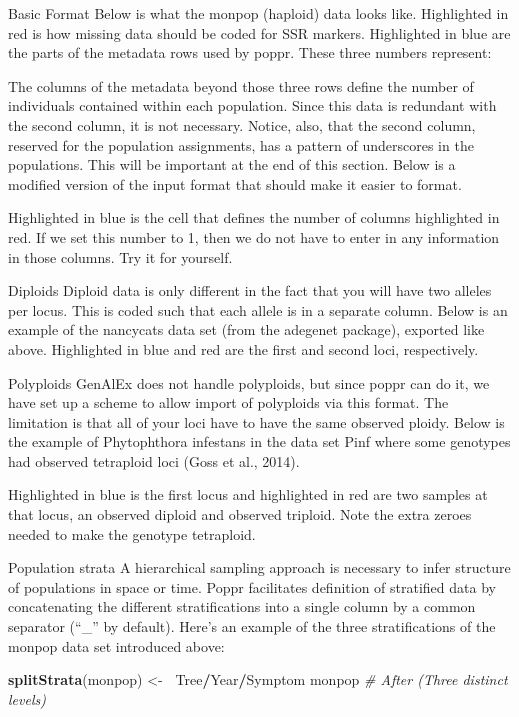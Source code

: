 \documentclass[12pt,]{krantz}
\newenvironment{Shaded}{\begin{snugshade}}{\end{snugshade}}
\newcommand{\KeywordTok}[1]{\textcolor[rgb]{0.27,0.27,0.27}{\textbf{#1}}}
\newcommand{\StringTok}[1]{\textcolor[rgb]{0.5,0.5,0.5}{#1}}
\newcommand{\CommentTok}[1]{\textcolor[rgb]{0.56,0.35,0.01}{\textit{#1}}}
\newcommand{\OperatorTok}[1]{\textcolor[rgb]{0.81,0.36,0.00}{\textbf{#1}}}
\newcommand{\ErrorTok}[1]{\textcolor[rgb]{0.64,0.00,0.00}{\textbf{#1}}}
\newcommand{\NormalTok}[1]{#1}
\theoremstyle{definition}
\theoremstyle{definition}
\theoremstyle{definition}
\theoremstyle{remark}
\begin{document}
Basic Format Below is what the monpop (haploid) data looks like.
Highlighted in red is how missing data should be coded for SSR markers.
Highlighted in blue are the parts of the metadata rows used by poppr.
These three numbers represent:

The columns of the metadata beyond those three rows define the number of
individuals contained within each population. Since this data is
redundant with the second column, it is not necessary. Notice, also,
that the second column, reserved for the population assignments, has a
pattern of underscores in the populations. This will be important at the
end of this section. Below is a modified version of the input format
that should make it easier to format.

Highlighted in blue is the cell that defines the number of columns
highlighted in red. If we set this number to 1, then we do not have to
enter in any information in those columns. Try it for yourself.

Diploids Diploid data is only different in the fact that you will have
two alleles per locus. This is coded such that each allele is in a
separate column. Below is an example of the nancycats data set (from the
adegenet package), exported like above. Highlighted in blue and red are
the first and second loci, respectively.

Polyploids GenAlEx does not handle polyploids, but since poppr can do
it, we have set up a scheme to allow import of polyploids via this
format. The limitation is that all of your loci have to have the same
observed ploidy. Below is the example of Phytophthora infestans in the
data set Pinf where some genotypes had observed tetraploid loci (Goss et
al., 2014).

Highlighted in blue is the first locus and highlighted in red are two
samples at that locus, an observed diploid and observed triploid. Note
the extra zeroes needed to make the genotype tetraploid.

Population strata A hierarchical sampling approach is necessary to infer
structure of populations in space or time. Poppr facilitates definition
of stratified data by concatenating the different stratifications into a
single column by a common separator (``\_'' by default). Here's an
example of the three stratifications of the monpop data set introduced
above:

\begin{Shaded}
\begin{Highlighting}[]
\KeywordTok{splitStrata}\NormalTok{(monpop) <-}\StringTok{ }\ErrorTok{~}\NormalTok{Tree}\OperatorTok{/}\NormalTok{Year}\OperatorTok{/}\NormalTok{Symptom}
\NormalTok{monpop }\CommentTok{# After (Three distinct levels)}
\end{Highlighting}
\end{Shaded}
\end{document}

